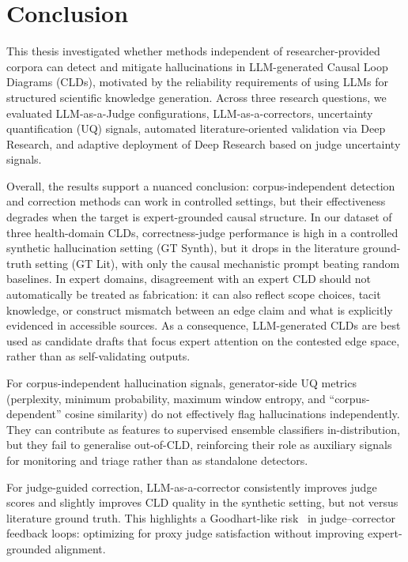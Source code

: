\chapter{Conclusion}
\label{sec:conclusion}

This thesis investigated whether methods independent of researcher-provided corpora can detect and mitigate hallucinations in LLM-generated Causal Loop Diagrams (CLDs), motivated by the reliability requirements of using LLMs for structured scientific knowledge generation. Across three research questions, we evaluated LLM-as-a-Judge configurations, LLM-as-a-correctors, uncertainty quantification (UQ) signals, automated literature-oriented validation via Deep Research, and adaptive deployment of Deep Research based on judge uncertainty signals.

Overall, the results support a nuanced conclusion: corpus-independent detection and correction methods can work in controlled settings, but their effectiveness degrades when the target is expert-grounded causal structure. In our dataset of three health-domain CLDs, correctness-judge performance is high in a controlled synthetic hallucination setting (GT Synth), but it drops in the literature ground-truth setting (GT Lit), with only the causal mechanistic prompt beating random baselines. In expert domains, disagreement with an expert CLD should not automatically be treated as fabrication: it can also reflect scope choices, tacit knowledge, or construct mismatch between an edge claim and what is explicitly evidenced in accessible sources. As a consequence, LLM-generated CLDs are best used as candidate drafts that focus expert attention on the contested edge space, rather than as self-validating outputs.

For corpus-independent hallucination signals, generator-side UQ metrics (perplexity, minimum probability, maximum window entropy, and ``corpus-dependent'' cosine similarity) do not effectively flag hallucinations independently. They can contribute as features to supervised ensemble classifiers in-distribution, but they fail to generalise out-of-CLD, reinforcing their role as auxiliary signals for monitoring and triage rather than as standalone detectors.

For judge-guided correction, LLM-as-a-corrector consistently improves judge scores and slightly improves CLD quality in the synthetic setting, but not versus literature ground truth. This highlights a Goodhart-like risk~\citep{goodhart1984problems} in judge--corrector feedback loops: optimizing for proxy judge satisfaction without improving expert-grounded alignment.

